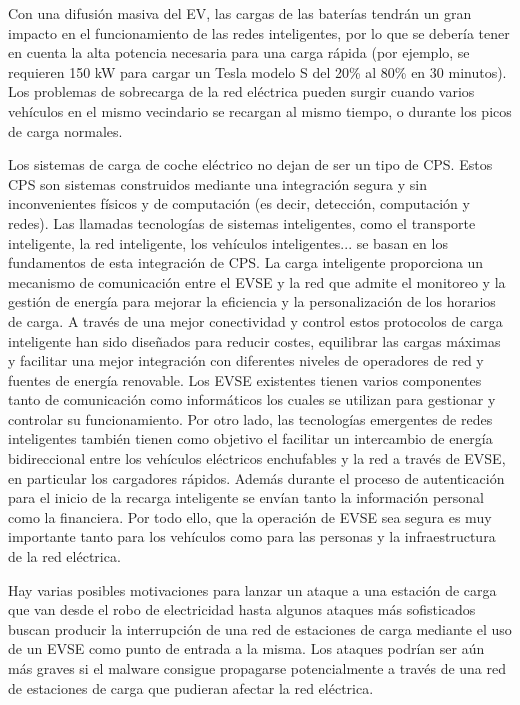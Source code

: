 \documentclass[12pt,a4paper,onecolumn,oneside]{report}
\begin{document}
Con una difusión masiva del EV, las cargas de las baterías tendrán un gran impacto en el funcionamiento de las redes inteligentes, por lo que se debería tener en cuenta la alta potencia necesaria para una carga rápida (por ejemplo, se requieren 150 kW para cargar un Tesla modelo S del 20\% al 80\% en 30 minutos). Los problemas de sobrecarga de la red eléctrica pueden surgir cuando varios vehículos en el mismo vecindario se recargan al mismo tiempo, o durante los picos de carga normales.

Los sistemas de carga de coche eléctrico no dejan de ser un tipo de CPS. Estos CPS son sistemas construidos mediante una integración segura y sin inconvenientes físicos y de computación (es decir, detección, computación y redes). Las llamadas tecnologías de sistemas inteligentes, como el transporte inteligente, la red inteligente, los vehículos inteligentes... se basan en los fundamentos de esta integración de CPS. La carga inteligente proporciona un mecanismo de comunicación entre el EVSE y la red que admite el monitoreo y la gestión de energía para mejorar la eficiencia y la personalización de los horarios de carga. A través de una mejor conectividad y control estos protocolos de carga inteligente han sido diseñados para reducir costes, equilibrar las cargas máximas y facilitar una mejor integración con diferentes niveles de operadores de red y fuentes de energía renovable. Los EVSE existentes tienen varios componentes tanto de comunicación como informáticos los cuales se utilizan para gestionar y controlar su funcionamiento. Por otro lado, las tecnologías emergentes de redes inteligentes también tienen como objetivo el facilitar un intercambio de energía bidireccional entre los vehículos eléctricos enchufables y la red a través de EVSE, en particular los cargadores rápidos. Además durante el proceso de autenticación para el inicio de la recarga inteligente se envían tanto la información personal como la financiera. Por todo ello, que la operación de EVSE sea segura es muy importante tanto para los vehículos como para las personas y la infraestructura de la red eléctrica.

Hay varias posibles motivaciones para lanzar un ataque a una estación de carga que van desde el robo de electricidad hasta algunos ataques más sofisticados buscan producir la interrupción de una red de estaciones de carga mediante el uso de un EVSE como punto de entrada a la misma. Los ataques podrían ser aún más graves si el malware consigue propagarse potencialmente a través de una red de estaciones de carga que pudieran afectar la red eléctrica.
\end{document}
